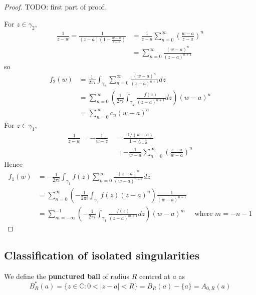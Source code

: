 \begin{proof}
	TODO: first part of proof.

	For $z \in \gamma_2$,
	\[
		\begin{aligned}
			\frac{1}{z - w} = \frac{1}{(z - a)(1 - \frac{w - a}{z - a})} & = \frac{1}{z - a} \sum_{n = 0}^{\infty} {\left( \frac{w - a}{z - a} \right)}^n \\
			& = \sum_{n = 0}^{\infty} \frac{{(w - a)}^n}{(z - a)^{n + 1}}
		\end{aligned}
	\]
	so
	\[
		\begin{aligned}
			f_2(w)
				& = \frac{1}{2 \pi i} \int_{\gamma_2} \sum_{n = 0}^{\infty} \frac{{(w - a)}^n}{(z - a)^{n + 1}} dz \\
				& = \sum_{n = 0}^{\infty} \left( \frac{1}{2 \pi i} \int_{\gamma_2} \frac{f(z)}{{(z - a)}^{n + 1}} dz \right) {(w - a)}^n \\
				& = \sum_{n = 0}^{\infty} c_n {(w - a)}^n
		\end{aligned}
	\]
	For $z \in \gamma_1$,
	\[
		\begin{aligned}
			\frac{1}{z - w} = -\frac{1}{w - z} & = \frac{-1 / (w - a)}{1 - \frac{z - a}{w - a}} \\
			& = -\frac{1}{w - a} \sum_{n = 0}^{\infty} {\left( \frac{z - a}{w - a} \right)}^n
		\end{aligned}
	\]
	Hence
	\[
		\begin{aligned}
			f_1(w)
				& = -\frac{1}{2 \pi i} \int_{\gamma_1} f(z) \sum_{n = 0}^{\infty} \frac{{(z - a)}^n}{{(w - a)}^{n + 1}} dz \\
				& = \sum_{n = 0}^{\infty} \left( -\frac{1}{2 \pi i} \int_{\gamma_1} f(z) {(z - a)}^n \right) \frac{1}{{(w - a)}^{n + 1}} \\
				& = \sum_{m = -\infty}^{-1} \left( -\frac{1}{2 \pi i} \int_{\gamma_1} \frac{f(z)}{{(z - a)}^{m + 1}} dz \right) {(w - a)}^m \quad \text{ where } m = -n - 1
		\end{aligned}
	\]
\end{proof}

\subsection{Classification of isolated singularities}

\begin{definition}
	We define the \textbf{punctured ball} of radius $R$ centred at $a$ as
	\[
		B_R^*(a) = \{ z \in \mathbb{C}: 0 < |z - a| < R \} = B_R(a) - \{ a \} = A_{0, R}(a)
	\]
\end{definition}

